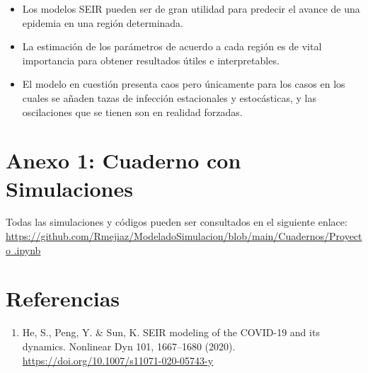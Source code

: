 \documentclass[conference]{IEEEtran}
\begin{document}
\begin{itemize}
\item Los modelos SEIR pueden ser de gran utilidad para predecir el avance de una epidemia en una región determinada.
\item La estimación de los parámetros de acuerdo a cada región es de vital importancia para obtener resultados útiles e interpretables.
\item El modelo en cuestión presenta caos pero únicamente para los casos en los cuales se añaden tazas de infección
      estacionales y estocásticas, y las oscilaciones que se tienen son en realidad forzadas.

\end{itemize}
\section*{Anexo 1: Cuaderno con Simulaciones}

Todas las simulaciones y códigos pueden ser consultados en el siguiente enlace: \href{https://github.com/Rmejiaz/ModeladoSimulacion/blob/main/Cuadernos/Proyecto.ipynb}{https://github.com/Rmejiaz/ModeladoSimulacion/blob/main/Cuadernos/Proyecto
.ipynb}


\section{Referencias}

\begin{enumerate}
    \item He, S., Peng, Y. \& Sun, K. SEIR modeling of the COVID-19 and its dynamics. Nonlinear Dyn 101, 1667–1680 (2020). \href{https://doi.org/10.1007/s11071-020-05743-y}{https://doi.org/10.1007/s11071-020-05743-y}
\end{enumerate}
\end{document}

